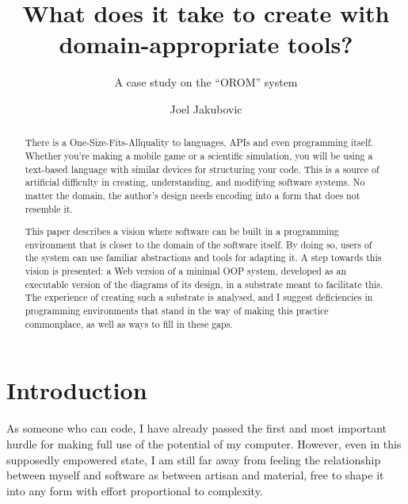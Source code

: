 \title{What does it take to create with domain-appropriate tools?}
\subtitle{A case study on the ``OROM'' system}
\author{Joel Jakubovic}

\maketitle

\newcommand{\joel}[1]{}
\newcommand{\svgel}[1]{\texttt{\textless{}#1\textgreater{}}}
\newcommand{\OSFA}{One-Size-Fits-All}

\begin{abstract}
There is a One-Size-Fits-Allquality to languages, APIs and even programming itself. Whether you're making a mobile game or a scientific simulation, you will be using a text-based language with similar devices for structuring your code. This is a source of artificial difficulty in creating, understanding, and modifying software systems. No matter the domain, the author's design needs encoding into a form that does not resemble it.

This paper describes a vision where software can be built in a programming environment that is closer to the domain of the software itself. By doing so, users of the system can use familiar abstractions and tools for adapting it. A step towards this vision is presented: a Web version of a minimal OOP system, developed as an executable version of the diagrams of its design, in a substrate meant to facilitate this. The experience of creating such a substrate is analysed, and I suggest deficiencies in programming environments that stand in the way of making this practice commonplace, as well as ways to fill in these gaps.
\end{abstract}


\hypertarget{introduction}{%
\section{Introduction}\label{introduction}}

As someone who can code, I have already passed the first and most
important hurdle for making full use of the potential of my computer.
However, even in this supposedly empowered state, I am still far away
from feeling the relationship between myself and software as between
artisan and material, free to shape it into any form with effort
proportional to complexity.

